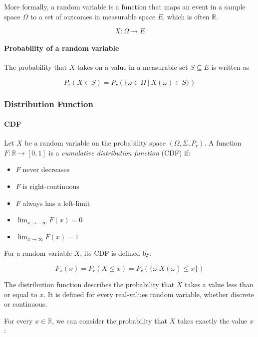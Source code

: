 \documentclass{article}
\begin{document}
More formally, a random variable is a function that maps an event in a
sample space \(\Omega\) to a set of outcomes in measurable space \(E\),
which is often \(\mathbb{R}\).

\[X:\Omega \to E\]

\paragraph{Probability of a random
variable}\label{probability-of-a-random-variable}

The probability that \(X\) takes on a value in a measurable set
\(S\subseteq E\) is written as

\[P_r(X\in S) = P_r(\{ \omega \in \Omega \ |\ X(\omega)\in S \})\]

\subsubsection{Distribution Function}\label{distribution-function}

\paragraph{CDF}\label{cdf}

Let \(X\) be a random variable on the probability space
\((\Omega, \Sigma, P_r)\). A function \(F: \mathbb{R}\to [0, 1]\) is a
\emph{cumulative distribution function} (CDF) if:

\begin{itemize}
\tightlist
\item
  \(F\) never decreases
\item
  \(F\) is right-continuous
\item
  \(F\) always has a left-limit
\item
  \(\lim_{x\to - \infty} F(x)=0\)
\item
  \(\lim_{x\to\infty} F(x)=1\)
\end{itemize}

For a random variable \(X\), its CDF is defined by:

\[F_x(x) = P_r(X \le x) = P_r(\{\omega | X(\omega) \le x \})\]

The distribution function describes the probability that \(X\) takes a
value less than or equal to \(x\). It is defined for every real-values
random variable, whether discrete or continuous.

For every \(x \in \mathbb{R}\), we can consider the probability that
\(X\) takes exactly the value \(x\):
\end{document}
